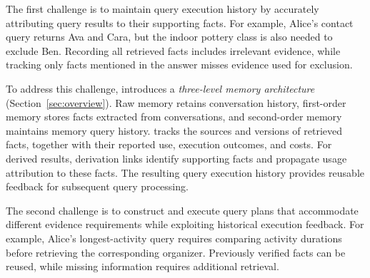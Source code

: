 
The first challenge is to maintain query execution history by accurately attributing query results to their supporting facts.
For example, Alice's contact query returns Ava and Cara, but the indoor pottery class is also needed to exclude Ben.
Recording all retrieved facts includes irrelevant evidence, while tracking only facts mentioned in the answer misses evidence used for exclusion.

To address this challenge, \sys introduces a \emph{three-level memory architecture} (Section~\ref{sec:overview}).
Raw memory retains conversation history, first-order memory stores facts extracted from conversations, and second-order memory maintains memory query history.
\sys tracks the sources and versions of retrieved facts, together with their reported use, execution outcomes, and costs. For derived results, derivation links identify supporting facts and propagate usage attribution to these facts. The resulting query execution history provides reusable feedback for subsequent query processing.

The second challenge is to construct and execute query plans that accommodate different evidence requirements while exploiting historical execution feedback.
For example, Alice's longest-activity query requires comparing activity durations before retrieving the corresponding organizer.
Previously verified facts can be reused, while missing information requires additional retrieval.

